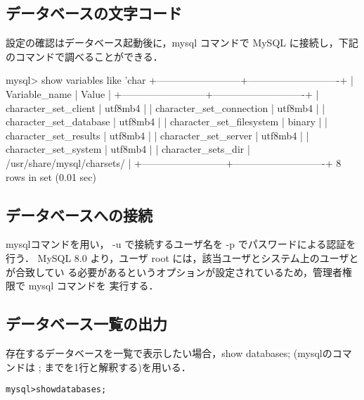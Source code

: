 \subsection*{データベースの文字コード}

設定の確認はデータベース起動後に，mysql コマンドで MySQL に接続し，下記
のコマンドで調べることができる．

\begin{cli}
mysql> show variables like 'char%
+--------------------------+----------------------------+
| Variable_name            | Value                      |
+--------------------------+----------------------------+
| character_set_client     | utf8mb4                    |
| character_set_connection | utf8mb4                    |
| character_set_database   | utf8mb4                    |
| character_set_filesystem | binary                     |
| character_set_results    | utf8mb4                    |
| character_set_server     | utf8mb4                    |
| character_set_system     | utf8mb4                    |
| character_sets_dir       | /usr/share/mysql/charsets/ |
+--------------------------+----------------------------+
8 rows in set (0.01 sec)
\end{cli}

\subsection*{データベースへの接続}
mysqlコマンドを用い， -u で接続するユーザ名を -p でパスワードによる認証を行う．
MySQL 8.0 より，ユーザ root には，該当ユーザとシステム上のユーザとが合致してい
る必要があるというオプションが設定されているため，管理者権限で mysql コマンドを
実行する．
	\begin{center}
	\end{center}
	
\subsection*{データベース一覧の出力}
存在するデータベースを一覧で表示したい場合，show databases; (mysqlのコマンドは ; までを1行と解釈する)を用いる．
	\begin{center}
	\begin{breakbox}
	\begin{alltt}
		mysql> show databases;
	\end{alltt}
	\end{breakbox}
	\end{center}

